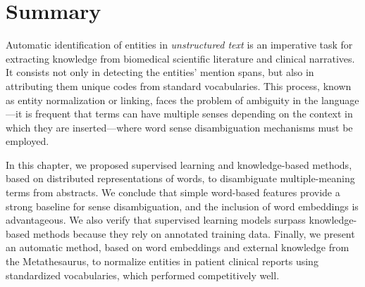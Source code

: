 


\section{Summary}

Automatic identification of entities in \textit{unstructured text} is an imperative task for extracting knowledge from biomedical scientific literature and clinical narratives.
It consists not only in detecting the entities' mention spans, but also in attributing them unique codes from standard vocabularies.
This process, known as entity normalization or linking, faces the problem of ambiguity in the language---it is frequent that terms can have multiple senses depending on the context in which they are inserted---where word sense disambiguation mechanisms must be employed.

In this chapter, we proposed supervised learning and knowledge-based methods, based on distributed representations of words, to disambiguate multiple-meaning terms from  abstracts.
We conclude that simple word-based features provide a strong baseline for sense disambiguation, and the inclusion of word embeddings is advantageous.
We also verify that supervised learning models surpass knowledge-based methods because they rely on annotated training data.
Finally, we present an automatic method, based on word embeddings and external knowledge from the  Metathesaurus, to normalize entities in patient clinical reports using standardized vocabularies, which performed competitively well.
